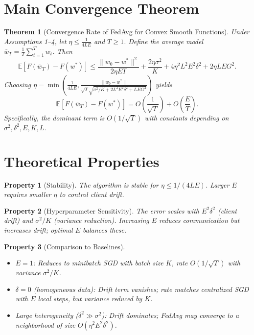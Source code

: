 \documentclass{article}
\newtheorem{theorem}{Theorem}
\newtheorem{property}{Property}
\begin{document}
\section*{Main Convergence Theorem}
\begin{theorem}[Convergence Rate of FedAvg for Convex Smooth Functions]
Under Assumptions 1--4, let $\eta \le \frac{1}{4LE}$ and $T \ge 1$. Define the average model $\bar{w}_T = \frac{1}{T}\sum_{t=1}^T w_t$. Then
\begin{equation}
\mathbb{E}[F(\bar{w}_T) - F(w^*)] \le \frac{\|w_0 - w^*\|^2}{2\eta E T} + \frac{2\eta \sigma^2}{K} + 4\eta^2 L^2 E^2 \delta^2 + 2\eta L E G^2.
\end{equation}
Choosing $\eta = \min\left(\frac{1}{4LE}, \frac{\|w_0 - w^*\|}{\sqrt{T} \sqrt{\sigma^2/K + 2L^2 E^2 \delta^2 + L E G^2}}\right)$ yields
\begin{equation}
\mathbb{E}[F(\bar{w}_T) - F(w^*)] = O\left(\frac{1}{\sqrt{T}}\right) + O\left(\frac{E}{T}\right).
\end{equation}
Specifically, the dominant term is $O(1/\sqrt{T})$ with constants depending on $\sigma^2, \delta^2, E, K, L$.
\end{theorem}

\section*{Theoretical Properties}
\begin{property}[Stability]
The algorithm is stable for $\eta \le 1/(4LE)$. Larger $E$ requires smaller $\eta$ to control client drift.
\end{property}
\begin{property}[Hyperparameter Sensitivity]
The error scales with $E^2\delta^2$ (client drift) and $\sigma^2/K$ (variance reduction). Increasing $E$ reduces communication but increases drift; optimal $E$ balances these.
\end{property}
\begin{property}[Comparison to Baselines]
\begin{itemize}
    \item $E=1$: Reduces to minibatch SGD with batch size $K$, rate $O(1/\sqrt{T})$ with variance $\sigma^2/K$.
    \item $\delta=0$ (homogeneous data): Drift term vanishes; rate matches centralized SGD with $E$ local steps, but variance reduced by $K$.
    \item Large heterogeneity ($\delta^2 \gg \sigma^2$): Drift dominates; FedAvg may converge to a neighborhood of size $O(\eta^2 E^2 \delta^2)$.
\end{itemize}
\end{property}
\end{document}
